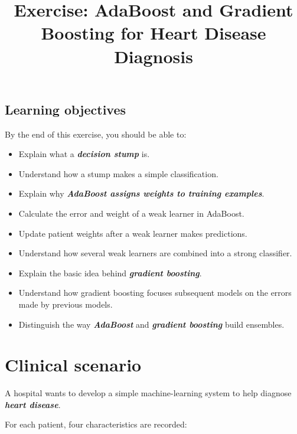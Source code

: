 \documentclass{course_sheet}
\begin{document}
\title{Exercise: AdaBoost and Gradient Boosting for Heart Disease Diagnosis}
\author{}
\date{}
\maketitle
\subsection*{Learning objectives}
By the end of this exercise, you should be able to:

\begin{itemize}
\item
Explain what a \textbf{\textit{decision stump}} is.

\item
Understand how a stump makes a simple classification.

\item
Explain why \textbf{\textit{AdaBoost assigns weights to training examples}}.

\item
Calculate the error and weight of a weak learner in AdaBoost.

\item
Update patient weights after a weak learner makes predictions.

\item
Understand how several weak learners are combined into a strong classifier.

\item
Explain the basic idea behind \textbf{\textit{gradient boosting}}.

\item
Understand how gradient boosting focuses subsequent models on the errors made by previous models.

\item
Distinguish the way \textbf{\textit{AdaBoost}} and \textbf{\textit{gradient boosting}} build ensembles.

\end{itemize}
\section*{Clinical scenario}
A hospital wants to develop a simple machine-learning system to help diagnose \textbf{\textit{heart disease}}.

For each patient, four characteristics are recorded:
\end{document}
